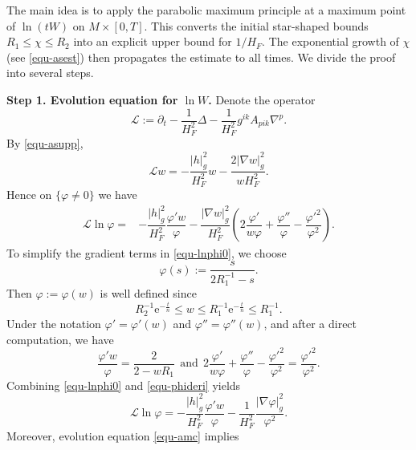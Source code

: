 \documentclass[10pt,a4paper]{amsart}
\numberwithin{equation}{section}
\begin{document}
		The main idea is to apply the parabolic maximum principle at a maximum point of $\ln(tW)$ on $M\times[0,T]$. This converts the initial star-shaped bounds $R_1 \leq \chi \leq R_2$ into an explicit upper bound for $1/H_F$. The exponential growth of $\chi$ (see \eqref{equ-asest}) then propagates the estimate to all times. We divide the proof into several steps.
		
		\textbf{Step 1. Evolution equation for $\ln W$.} Denote the operator
		\begin{equation*}
			\mathscr{L}:=\partial_t  - \dfrac{1}{H_F^2}\Delta- \dfrac{1}{H_F^2}g^{ik}A_{pik}\nabla^p.
		\end{equation*}
		By \eqref{equ-asupp},
		\begin{equation*}
			\mathscr{L} w = - \dfrac{|h|_{g}^2}{H_F^2}w - \dfrac{2|\nabla w|_{g}^2}{w H_F^2}.
		\end{equation*}
		Hence on $\{\varphi\neq 0\}$ we have
		\begin{align}
			\mathscr{L} \ln\varphi =& -\dfrac{|h|_{g}^2}{H_F^2}\dfrac{\varphi' w}{\varphi} - \dfrac{|\nabla w|_{g}^2}{H_F^2}\left( 2\dfrac{\varphi'}{w\varphi} + \dfrac{\varphi''}{\varphi} - \dfrac{\varphi'^2}{\varphi^2} \right). \label{equ-lnphi0}
		\end{align}
		To simplify the gradient terms in \eqref{equ-lnphi0}, we choose
		\begin{equation*}
			\varphi(s):= \dfrac{s}{2R_1^{-1}-s}.
		\end{equation*}
		Then $\varphi:=\varphi(w)$ is well defined since
		\begin{equation}
			R_2^{-1}\mathrm{e}^{-\frac{t}{n}} \leq w \leq R_1^{-1}\mathrm{e}^{-\frac{t}{n}} \leq R_1^{-1}.
			\label{equ-west}
		\end{equation}
		Under the notation $\varphi'=\varphi'(w)$ and $\varphi''=\varphi''(w)$, and after a direct computation, we have
		\begin{equation}
			\dfrac{\varphi' w}{\varphi} = \dfrac{2}{2-w R_1}\ \ \text{and}\ \ 2\dfrac{\varphi'}{w\varphi} + \dfrac{\varphi''}{\varphi} - \dfrac{\varphi'^2}{\varphi^2} = \dfrac{\varphi'^2}{\varphi^2}.
			\label{equ-phideri}
		\end{equation}
		Combining \eqref{equ-lnphi0} and \eqref{equ-phideri} yields
		\begin{equation}
			\mathscr{L}\ln\varphi = -\dfrac{|h|_{g}^2}{H_F^2}\dfrac{\varphi' w}{\varphi} -\dfrac{1}{H_F^2}\dfrac{|\nabla\varphi|^2_{g}}{\varphi^2}. \label{equ-lnphi}
		\end{equation}
		Moreover, evolution equation \eqref{equ-amc} implies
\end{document}

